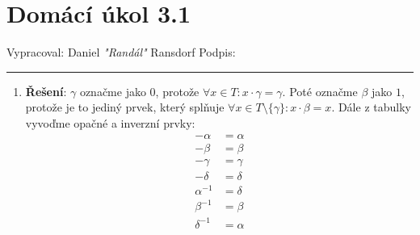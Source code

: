 \documentclass[12pt]{article}
\begin{document}
\section*{Domácí úkol 3.1}

Vypracoval: Daniel \textit{"Randál"} Ransdorf \hfill Podpis: \rule{4cm}{0.4pt}

\begin{enumerate}
  \item \textbf{Řešení}:
    $\gamma$ označme jako $0$, protože $\forall x \in T : x \cdot \gamma = \gamma$.
    Poté označme $\beta$ jako $1$, protože je to jediný prvek, který
    splňuje $\forall x \in T \setminus \{\gamma\} : x \cdot \beta = x$.
    Dále z tabulky vyvoďme opačné a inverzní prvky:
    \begin{align*}
      -\alpha &= \alpha \\
      -\beta &= \beta \\
      -\gamma &= \gamma \\
      -\delta &= \delta \\
      \alpha^{-1} &= \delta \\
      \beta^{-1} &= \beta \\
      \delta^{-1} &= \alpha
    \end{align*}


\end{enumerate}
\end{document}
